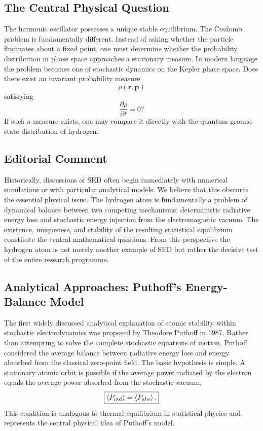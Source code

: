 \subsection{The Central Physical Question}
The harmonic oscillator possesses a unique stable equilibrium.
The Coulomb problem is fundamentally different.
Instead of asking whether the particle fluctuates about a fixed point,
one must determine whether the probability distribution in phase space
approaches a stationary measure.
In modern language the problem becomes one of stochastic dynamics on the
Kepler phase space.
Does there exist an invariant probability measure
\[\rho(\mathbf r,\mathbf p)\]
satisfying
\[\frac{\partial\rho}{\partial t}=0?\]
If such a measure exists, one may compare it directly with the quantum
ground-state distribution of hydrogen.
\subsection*{Editorial Comment}
Historically, discussions of SED often begin immediately with numerical
simulations or with particular analytical models. We believe that this
obscures the essential physical issue.
The hydrogen atom is fundamentally a problem of dynamical balance
between two competing mechanisms: deterministic radiative energy loss
and stochastic energy injection from the electromagnetic vacuum. The
existence, uniqueness, and stability of the resulting statistical
equilibrium constitute the central mathematical questions.
From this perspective the hydrogen atom is not merely another example of
SED but rather the decisive test of the entire research programme.
\subsection{Analytical Approaches: Puthoff's Energy-Balance Model}
\label{sec:Puthoff}
The first widely discussed analytical explanation of atomic stability
within stochastic electrodynamics was proposed by Theodore Puthoff in
1987. Rather than attempting to solve the complete stochastic equations
of motion, Puthoff considered the average balance between radiative
energy loss and energy absorbed from the classical zero-point field.
The basic hypothesis is simple.
A stationary atomic orbit is possible if the average power radiated by
the electron equals the average power absorbed from the stochastic
vacuum,
\begin{equation}
\boxed{\left\langle P_{\rm rad}\right\rangle=
\left\langle P_{\rm abs}\right\rangle .}
\label{eq:EnergyBalance}
\end{equation}
This condition is analogous to thermal equilibrium in statistical
physics and represents the central physical idea of Puthoff's model.
